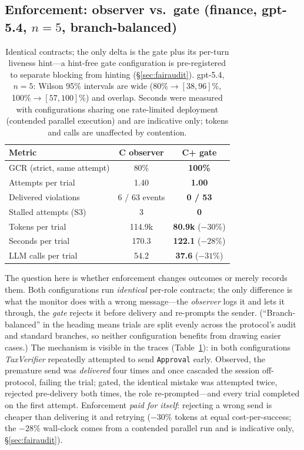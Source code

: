 \documentclass{article}
\begin{document}
\subsection{Enforcement: observer vs.\ gate (finance, gpt-5.4, $n{=}5$, branch-balanced)}
\begin{table}[t]
\centering\small
\caption{Identical contracts; the only delta is the gate plus its per-turn liveness hint---a hint-free gate configuration is pre-registered to separate blocking from hinting (\S\ref{sec:fairaudit}). gpt-5.4, $n{=}5$: Wilson 95\% intervals are wide (80\%$\to[38,96]\%$, 100\%$\to[57,100]\%$) and overlap. Seconds were measured with configurations sharing one rate-limited deployment (contended parallel execution) and are indicative only; tokens and calls are unaffected by contention.}
\label{tab:gate}
\begin{tabular}{@{}lcc@{}}
\toprule
\textbf{Metric} & \textbf{C observer} & \textbf{C+ gate} \\
\midrule
GCR (strict, same attempt) & 80\% & \textbf{100\%} \\
Attempts per trial & 1.40 & \textbf{1.00} \\
Delivered violations & 6 / 63 events & \textbf{0 / 53} \\
Stalled attempts (S3) & 3 & \textbf{0} \\
Tokens per trial & 114.9k & \textbf{80.9k} ($-30\%$) \\
Seconds per trial & 170.3 & \textbf{122.1} ($-28\%$) \\
LLM calls per trial & 54.2 & \textbf{37.6} ($-31\%$) \\
\bottomrule
\end{tabular}
\end{table}
The question here is whether enforcement changes outcomes or merely records them. Both configurations run \emph{identical} per-role contracts; the only difference is what the monitor does with a wrong message---the \emph{observer} logs it and lets it through, the \emph{gate} rejects it before delivery and re-prompts the sender. (``Branch-balanced'' in the heading means trials are split evenly across the protocol's audit and standard branches, so neither configuration benefits from drawing easier cases.) The mechanism is visible in the traces (Table~\ref{tab:gate}): in both configurations \textit{TaxVerifier} repeatedly attempted to send \texttt{Approval} early. Observed, the premature send was \emph{delivered} four times and once cascaded the session off-protocol, failing the trial; gated, the identical mistake was attempted twice, rejected pre-delivery both times, the role re-prompted---and every trial completed on the first attempt. Enforcement \emph{paid for itself}: rejecting a wrong send is cheaper than delivering it and retrying ($-30\%$ tokens at equal cost-per-success; the $-28\%$ wall-clock comes from a contended parallel run and is indicative only, \S\ref{sec:fairaudit}).
\end{document}
